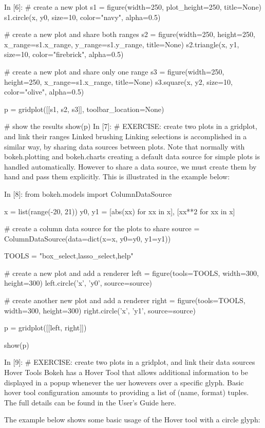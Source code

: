 In [6]:
# create a new plot
s1 = figure(width=250, plot_height=250, title=None)
s1.circle(x, y0, size=10, color="navy", alpha=0.5)

# create a new plot and share both ranges
s2 = figure(width=250, height=250, x_range=s1.x_range, y_range=s1.y_range, title=None)
s2.triangle(x, y1, size=10, color="firebrick", alpha=0.5)

# create a new plot and share only one range
s3 = figure(width=250, height=250, x_range=s1.x_range, title=None)
s3.square(x, y2, size=10, color="olive", alpha=0.5)

p = gridplot([[s1, s2, s3]], toolbar_location=None)

# show the results
show(p)
In [7]:
# EXERCISE: create two plots in a gridplot, and link their ranges
Linked brushing
Linking selections is accomplished in a similar way, by sharing data sources between plots. Note that normally with bokeh.plotting and bokeh.charts creating a default data source for simple plots is handled automatically. However to share a data source, we must create them by hand and pass them explicitly. This is illustrated in the example below:

In [8]:
from bokeh.models import ColumnDataSource

x = list(range(-20, 21))
y0, y1 = [abs(xx) for xx in x], [xx**2 for xx in x]

# create a column data source for the plots to share
source = ColumnDataSource(data=dict(x=x, y0=y0, y1=y1))

TOOLS = "box_select,lasso_select,help"

# create a new plot and add a renderer
left = figure(tools=TOOLS, width=300, height=300)
left.circle('x', 'y0', source=source)

# create another new plot and add a renderer
right = figure(tools=TOOLS, width=300, height=300)
right.circle('x', 'y1', source=source)

p = gridplot([[left, right]])

show(p)
 
In [9]:
# EXERCISE: create two plots in a gridplot, and link their data sources
Hover Tools
Bokeh has a Hover Tool that allows additional information to be displayed in a popup whenever the uer howevers over a specific glyph. Basic hover tool configuration amounts to providing a list of (name, format) tuples. The full details can be found in the User's Guide here.

The example below shows some basic usage of the Hover tool with a circle glyph:

